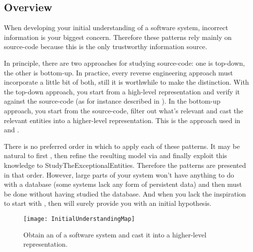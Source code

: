 \documentclass[a4paper,10pt,twoside]{book}
\begin{document}
\subsection*{Overview}

When developing your initial understanding of a software system, incorrect information is 
your biggest concern. Therefore these patterns rely mainly on source-code because this is 
the only trustworthy information source.

In principle, there are two approaches for studying source-code: one is top-down, the other 
is bottom-up. In practice, every reverse engineering approach must incorporate a little bit 
of both, still it is worthwhile to make the distinction. With the top-down approach, you 
start from a high-level representation and verify it against the source-code (as for 
instance described in ). In the 
bottom-up approach, you start from the source-code, filter out what's relevant and cast the 
relevant entities into a higher-level representation. This is the approach used in 
 and .

There is no preferred order in which to apply each of these patterns. It may be natural to 
first , then refine the 
resulting model via  and finally 
exploit this knowledge to 
{StudyTheExceptionalEntities}. Therefore the patterns are presented in that order. However, 
large parts of your system won't have anything to do with a database (some systems lack any 
form of persistent data) and then  
must be done without having studied the database. And when you lack the inspiration to 
start with , then  will surely provide you with an initial 
hypothesis.

\begin{figure}
\begin{center}
\texttt{[image: InitialUnderstandingMap]}
\caption{Obtain an  of a software 
system and cast it into a higher-level representation.}
\end{center}
\end{figure}
\end{document}
